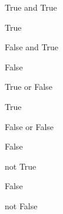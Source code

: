 \begin{pyin}
True and True
\end{pyin}





\begin{raw}
True
\end{raw}







\begin{pyin}
False and True
\end{pyin}





\begin{raw}
False
\end{raw}







\begin{pyin}
True or False
\end{pyin}





\begin{raw}
True
\end{raw}







\begin{pyin}
False or False
\end{pyin}





\begin{raw}
False
\end{raw}







\begin{pyin}
not True
\end{pyin}





\begin{raw}
False
\end{raw}







\begin{pyin}
not False
\end{pyin}





